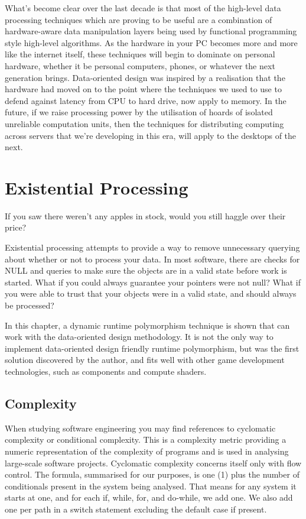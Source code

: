 \documentclass[a4paper,12pt]{article}
\begin{document}
What's become clear over the last decade is that most of the high-level data processing techniques which are proving to be useful are a combination of hardware-aware data manipulation layers being used by functional programming style high-level algorithms. As the hardware in your PC becomes more and more like the internet itself, these techniques will begin to dominate on personal hardware, whether it be personal computers, phones, or whatever the next generation brings. Data-oriented design was inspired by a realisation that the hardware had moved on to the point where the techniques we used to use to defend against latency from CPU to hard drive, now apply to memory. In the future, if we raise processing power by the utilisation of hoards of isolated unreliable computation units, then the techniques for distributing computing across servers that we're developing in this era, will apply to the desktops of the next.

\newpage
\section{Existential Processing}

If you saw there weren't any apples in stock, would you still haggle over their price?

Existential processing attempts to provide a way to remove unnecessary querying about whether or not to process your data.
In most software, there are checks for NULL and queries to make sure the objects are in a valid state before work is started.
What if you could always guarantee your pointers were not null?
What if you were able to trust that your objects were in a valid state, and should always be processed?

In this chapter, a dynamic runtime polymorphism technique is shown that can work with the data-oriented design methodology.
It is not the only way to implement data-oriented design friendly runtime polymorphism, but was the first solution discovered by the author, and fits well with other game development technologies, such as components and compute shaders.

\subsection{Complexity}

When studying software engineering you may find references to cyclomatic complexity or conditional complexity.
This is a complexity metric providing a numeric representation of the complexity of programs and is used in analysing large-scale software projects.
Cyclomatic complexity concerns itself only with flow control.
The formula, summarised for our purposes, is one (1) plus the number of conditionals present in the system being analysed.
That means for any system it starts at one, and for each if, while, for, and do-while, we add one.
We also add one per path in a switch statement excluding the default case if present.
\end{document}
